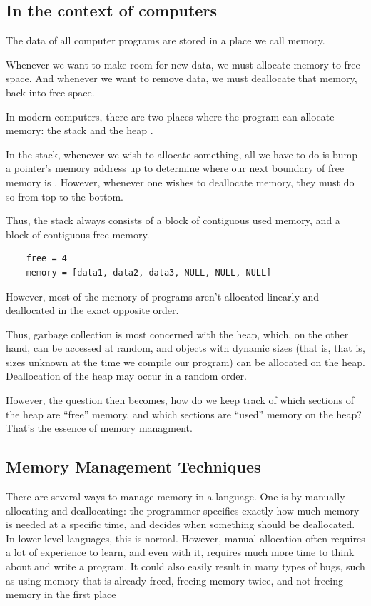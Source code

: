 \documentclass[index]{subfiles}
\begin{document}
\subsection{In the context of computers}

The data of all computer programs are stored in a place we call memory.

Whenever we want to make room for new data, we must allocate memory to free space. And whenever we want to remove data, we must deallocate that memory, back into free space.

In modern computers, there are two places where the program can allocate memory: the stack and the heap .

In the stack, whenever we wish to allocate something, all we have to do is bump a pointer's memory address up to determine where our next boundary of free memory is \cite{the_rust_programming_language}. However, whenever one wishes to deallocate memory, they must do so from top to the bottom.

Thus, the stack always consists of a block of contiguous used memory, and a block of contiguous free memory.

\begin{verbatim}
    free = 4
    memory = [data1, data2, data3, NULL, NULL, NULL]
\end{verbatim}

However, most of the memory of programs aren't allocated linearly and deallocated in the exact opposite order.

Thus, garbage collection is most concerned with the heap, which, on the other hand, can be accessed at random, and objects with dynamic sizes (that is, that is, sizes unknown at the time we compile our program) can be allocated on the heap. Deallocation of the heap may occur in a random order.

However, the question then becomes, how do we keep track of which sections of the heap are ``free'' memory, and which sections are ``used'' memory on the heap? That's the essence of memory managment.

\subsection{Memory Management Techniques}

There are several ways to manage memory in a language. One is by manually allocating and deallocating: the programmer specifies exactly how much memory is needed at a specific time, and decides when something should be deallocated. In lower-level languages, this is normal. However, manual allocation often requires a lot of experience to learn, and even with it, requires much more time to think about and write a program. It could also easily result in many types of bugs, such as using memory that is already freed, freeing memory twice, and not freeing memory in the first place \cite[Chapter~1]{garbage_collection_overview_uw, gc_handbook}
\end{document}

